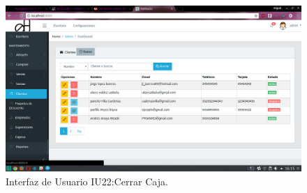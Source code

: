 \begin{figure}[htbp!]
	\begin{center}
\includegraphics[width=\textwidth]{Pantallas/tablaClientes}
		\caption{Interfaz de Usuario IU22:Cerrar Caja.}
	\end{center}
\end{figure}
